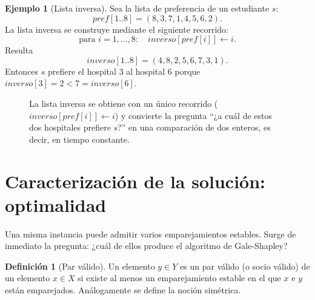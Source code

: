 \documentclass[12pt, spanish, oneside, openany]{book}
\theoremstyle{uprightplain}
\theoremstyle{definition}
\newtheorem{definicion}[teorema]{Definición}
\newtheorem{ejemplo}[teorema]{Ejemplo}
\theoremstyle{remark}
\theoremstyle{definition}
\begin{document}
\begin{ejemplo}[Lista inversa]
Sea la lista de preferencia de un estudiante $s$:
\[
\mathit{pref}[1..8] = (8,3,7,1,4,5,6,2).
\]
La lista inversa se construye mediante el siguiente recorrido:
\[
\text{para } i=1,\dots,8:\quad \mathit{inverso}[\mathit{pref}[i]] \leftarrow i.
\]
Resulta
\[
\mathit{inverso}[1..8] = (4,8,2,5,6,7,3,1).
\]
Entonces $s$ prefiere el hospital $3$ al hospital $6$ porque $\mathit{inverso}[3]=2 < 7=\mathit{inverso}[6]$.
\end{ejemplo}
\begin{figure}[H]
\centering
{}
\caption{La lista inversa se obtiene con un único recorrido
($\mathit{inverso}[\mathit{pref}[i]]\leftarrow i$) y convierte la pregunta
``¿a cuál de estos dos hospitales prefiere $s$?'' en una comparación de dos
enteros, es decir, en tiempo constante.}
\label{fig:lista-inversa}
\end{figure}

\section{Caracterización de la solución: optimalidad}

Una misma instancia puede admitir varios emparejamientos estables. Surge de inmediato la pregunta: ¿cuál de ellos produce el algoritmo de Gale-Shapley?

\begin{definicion}[Par válido]
\label{def:par-valido}
Un elemento $y \in Y$ es un par válido (o socio válido) de un elemento $x \in X$ si existe al menos un emparejamiento estable en el que $x$ e $y$ están emparejados. Análogamente se define la noción simétrica.
\end{definicion}
\end{document}
